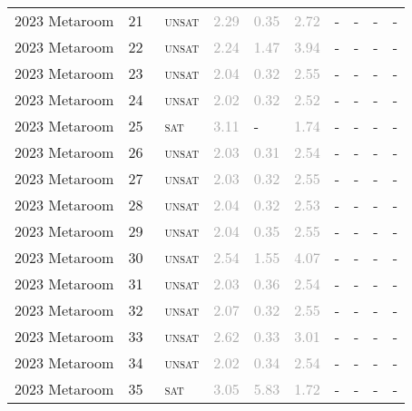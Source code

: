 \begin{center}
{\begin{longtable}{@{}llllllllll@{}}
2023 Metaroom & 21 & ~\textsc{unsat} & \textcolor{darkgray}{2.29} & \textcolor{darkgray}{0.35} & \textcolor{darkgray}{2.72} & - & - & - & - \\
2023 Metaroom & 22 & ~\textsc{unsat} & \textcolor{darkgray}{2.24} & \textcolor{darkgray}{1.47} & \textcolor{darkgray}{3.94} & - & - & - & - \\
2023 Metaroom & 23 & ~\textsc{unsat} & \textcolor{darkgray}{2.04} & \textcolor{darkgray}{0.32} & \textcolor{darkgray}{2.55} & - & - & - & - \\
2023 Metaroom & 24 & ~\textsc{unsat} & \textcolor{darkgray}{2.02} & \textcolor{darkgray}{0.32} & \textcolor{darkgray}{2.52} & - & - & - & - \\
2023 Metaroom & 25 & ~\textsc{sat} & \textcolor{darkgray}{3.11} & - & \textcolor{darkgray}{1.74} & - & - & - & - \\
2023 Metaroom & 26 & ~\textsc{unsat} & \textcolor{darkgray}{2.03} & \textcolor{darkgray}{0.31} & \textcolor{darkgray}{2.54} & - & - & - & - \\
2023 Metaroom & 27 & ~\textsc{unsat} & \textcolor{darkgray}{2.03} & \textcolor{darkgray}{0.32} & \textcolor{darkgray}{2.55} & - & - & - & - \\
2023 Metaroom & 28 & ~\textsc{unsat} & \textcolor{darkgray}{2.04} & \textcolor{darkgray}{0.32} & \textcolor{darkgray}{2.53} & - & - & - & - \\
2023 Metaroom & 29 & ~\textsc{unsat} & \textcolor{darkgray}{2.04} & \textcolor{darkgray}{0.35} & \textcolor{darkgray}{2.55} & - & - & - & - \\
2023 Metaroom & 30 & ~\textsc{unsat} & \textcolor{darkgray}{2.54} & \textcolor{darkgray}{1.55} & \textcolor{darkgray}{4.07} & - & - & - & - \\
2023 Metaroom & 31 & ~\textsc{unsat} & \textcolor{darkgray}{2.03} & \textcolor{darkgray}{0.36} & \textcolor{darkgray}{2.54} & - & - & - & - \\
2023 Metaroom & 32 & ~\textsc{unsat} & \textcolor{darkgray}{2.07} & \textcolor{darkgray}{0.32} & \textcolor{darkgray}{2.55} & - & - & - & - \\
2023 Metaroom & 33 & ~\textsc{unsat} & \textcolor{darkgray}{2.62} & \textcolor{darkgray}{0.33} & \textcolor{darkgray}{3.01} & - & - & - & - \\
2023 Metaroom & 34 & ~\textsc{unsat} & \textcolor{darkgray}{2.02} & \textcolor{darkgray}{0.34} & \textcolor{darkgray}{2.54} & - & - & - & - \\
2023 Metaroom & 35 & ~\textsc{sat} & \textcolor{darkgray}{3.05} & \textcolor{darkgray}{5.83} & \textcolor{darkgray}{1.72} & - & - & - & - \\

\end{longtable}}
\end{center}
